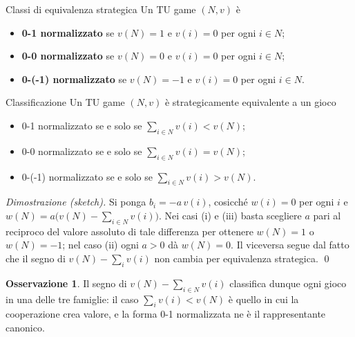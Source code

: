 \documentclass[12pt,a4paper,twoside]{book}
\theoremstyle{plain}
\theoremstyle{definition}
\newtheorem{remark}[theorem]{Osservazione}
\begin{document}
\begin{defbox}{Classi di equivalenza strategica}
Un TU game $(N,v)$ è
\begin{itemize}
  \item \textbf{0-1 normalizzato} se $v(N)=1$ e $v(i)=0$ per ogni $i\in N$;
  \item \textbf{0-0 normalizzato} se $v(N)=0$ e $v(i)=0$ per ogni $i\in N$;
  \item \textbf{0-(-1) normalizzato} se $v(N)=-1$ e $v(i)=0$ per ogni $i\in N$.
\end{itemize}
\end{defbox}

\begin{thmbox}{Classificazione}
Un TU game $(N,v)$ è strategicamente equivalente a un gioco
\begin{itemize}
  \item[(i)] 0-1 normalizzato se e solo se $\sum_{i\in N}v(i)<v(N)$;
  \item[(ii)] 0-0 normalizzato se e solo se $\sum_{i\in N}v(i)=v(N)$;
  \item[(iii)] 0-(-1) normalizzato se e solo se $\sum_{i\in N}v(i)>v(N)$.
\end{itemize}
\end{thmbox}

\textit{Dimostrazione (sketch).} Si ponga $b_i=-a\,v(i)$, cosicché $w(i)=0$ per ogni $i$ e $w(N)=a\bigl(v(N)-\sum_{i\in N}v(i)\bigr)$. Nei casi (i) e (iii) basta scegliere $a$ pari al reciproco del valore assoluto di tale differenza per ottenere $w(N)=1$ o $w(N)=-1$; nel caso (ii) ogni $a>0$ dà $w(N)=0$. Il viceversa segue dal fatto che il segno di $v(N)-\sum_i v(i)$ non cambia per equivalenza strategica. \qed

\begin{remark}
Il segno di $v(N)-\sum_{i\in N}v(i)$ classifica dunque ogni gioco in una delle tre famiglie: il caso $\sum_i v(i)<v(N)$ è quello in cui la cooperazione crea valore, e la forma 0-1 normalizzata ne è il rappresentante canonico.
\end{remark}
\end{document}
